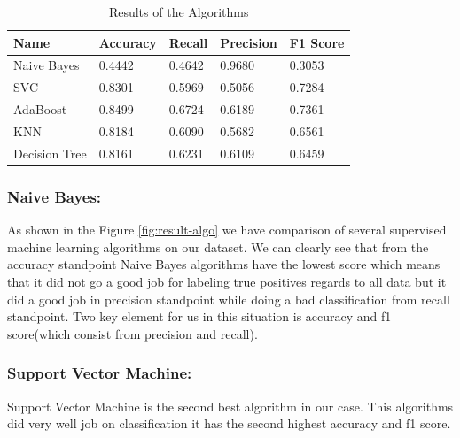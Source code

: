 \documentclass[sigconf]{acmart}
\begin{document}
\begin{table}
\centering
\begin{tabular}{lllll}
\hline
Name                                & Accuracy                    & Recall                      & Precision                   & F1 Score                    \\ \hline
\multicolumn{1}{|l|}{Naive Bayes}   & \multicolumn{1}{l|}{0.4442} & \multicolumn{1}{l|}{0.4642} & \multicolumn{1}{l|}{0.9680} & \multicolumn{1}{l|}{0.3053} \\ \hline
\multicolumn{1}{|l|}{SVC}           & \multicolumn{1}{l|}{0.8301} & \multicolumn{1}{l|}{0.5969} & \multicolumn{1}{l|}{0.5056} & \multicolumn{1}{l|}{0.7284} \\ \hline
\multicolumn{1}{|l|}{AdaBoost}      & \multicolumn{1}{l|}{0.8499} & \multicolumn{1}{l|}{0.6724} & \multicolumn{1}{l|}{0.6189} & \multicolumn{1}{l|}{0.7361} \\ \hline
\multicolumn{1}{|l|}{KNN}           & \multicolumn{1}{l|}{0.8184} & \multicolumn{1}{l|}{0.6090} & \multicolumn{1}{l|}{0.5682} & \multicolumn{1}{l|}{0.6561} \\ \hline
\multicolumn{1}{|l|}{Decision Tree} & \multicolumn{1}{l|}{0.8161} & \multicolumn{1}{l|}{0.6231} & \multicolumn{1}{l|}{0.6109} & \multicolumn{1}{l|}{0.6459} \\ \hline
\end{tabular}
\caption{Results of the Algorithms \cite{Borga2017}}
\label{result-table}
\end{table}

\subsubsection{\textbf{\underline{Naive Bayes:}}} 
As shown in the Figure \ref{fig:result-algo} we have comparison of several supervised machine learning algorithms on our dataset. We can clearly see that from the accuracy standpoint Naive Bayes algorithms have the lowest score which means that it did not go a good job for labeling true positives regards to all data but it did a good job in precision standpoint while doing a bad classification from recall standpoint. Two key element for us in this situation is accuracy and f1 score(which consist from precision and recall). 
\subsubsection{\textbf{\underline{Support Vector Machine:}}}
Support Vector Machine is the second best algorithm in our case. This algorithms did very well job on classification it has the second highest accuracy and f1 score. 
\end{document}
